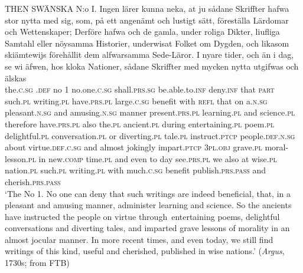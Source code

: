 \documentclass[output=paper]{langscibook}
\begin{document}
\ea        \label{ex:intro:3}
\gll  THEN   SWÄNSKA        N:o I.     Ingen         lärer  kunna         neka,     at     ju       sådane   Skriffter hafwa         stor       nytta     med   sig,   som,   på   ett     angenämt   och lustigt         sätt,     föreställa       Lärdomar   och Wettenskaper;   Derföre hafwa         och de     gamla,     under   roliga         Dikter, liufliga       Samtahl         eller   nöysamma   Historier, underwisat Folket           om   Dygden,        och   likasom   skiämtewijs   förehållit dem       alfwarsamma   Sede-Läror.      I  nyare       tider,    och   än     i   dag, se             wi   äfwen, hos kloka     Nationer,   sådane   Skriffter med   mycken     nytta       utgifwas         och   älskas\\
  the.\textsc{c.sg}   \textsc{.def}    no 1  no.one.\textsc{c.sg}   shall\textsc{.prs.sg} be.able.to.\textsc{inf}  deny.\textsc{inf}   that   \textsc{part}  such.\textsc{pl}  writing.\textsc{pl}  have.\textsc{prs.pl}   large.\textsc{c.sg}  benefit  with  \textsc{refl}  that  on    a.\textsc{n.sg}  pleasant.\textsc{n.sg}  and amusing.\textsc{n.sg}   manner  present.\textsc{prs.pl}    learning.\textsc{pl}  and science.\textsc{pl}    therefore have.\textsc{prs.pl}   also the.\textsc{pl}  ancient\textsc{.pl}  during  entertaining.\textsc{pl}  poem.\textsc{pl} delightful.\textsc{pl}  conversation.\textsc{pl}   or    diverting.\textsc{pl}  tale.\textsc{pl}  instruct.\textsc{ptcp} people.\textsc{def.n.sg}  about  virtue.\textsc{def.c.sg}  and  almost  jokingly    impart.\textsc{ptcp} \textsc{3pl.obj}  grave.\textsc{pl}      moral-lesson\textsc{.pl}  in   new.\textsc{comp}  time.\textsc{pl}  and  even to   day see.\textsc{prs.pl}   we   also     at  wise.\textsc{pl}  nation.\textsc{pl}  such.\textsc{pl}   writing.\textsc{pl} with   much\textsc{.c.sg}   benefit   publish.\textsc{prs.pass}   and  cherish.\textsc{prs.pass}\\
\glt ‘The   No 1. No one can deny that such writings are indeed beneficial, that, in a pleasant and amusing manner, administer learning and science. So the ancients have instructed the people on virtue through~entertaining poems, delightful conversations and diverting tales, and imparted grave lessons of morality in an almost jocular manner. In more recent times, and even today, we still find writings of this kind, useful and cherished, published in wise nations.’ (\textit{Argus}, 1730s; from FTB)
\z
\end{document}
